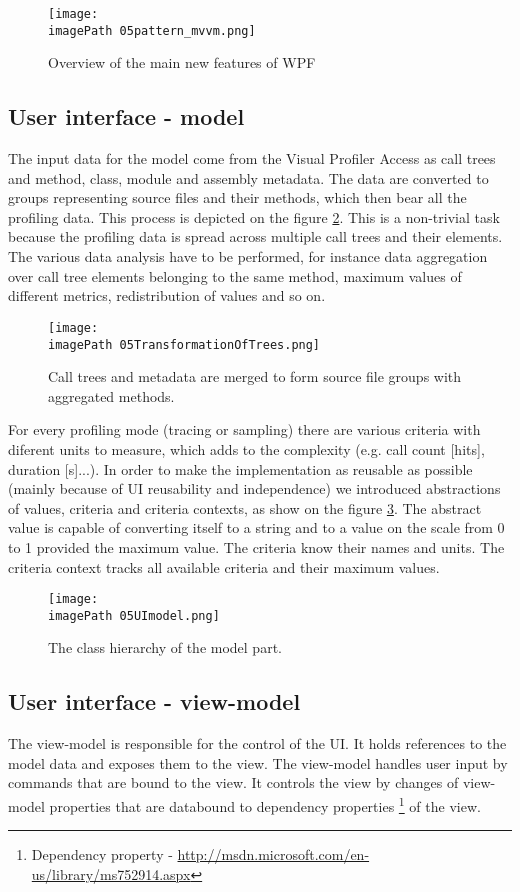\begin{figure}
	\centering
		\texttt{[image: \\imagePath 05pattern\_mvvm.png]}
		\caption{Overview of the main new features of WPF \cite{WPFpage}}
	\label{fig:05pattern_mvvm}
\end{figure}

\subsection{User interface - model}
The input data for the model come from the Visual Profiler Access as call trees and method, class, module and assembly metadata. The data are converted to groups representing source files and their methods, which then bear all the profiling data. This process is depicted on the figure \ref{fig:05TransformationOfTrees}. This is a non-trivial task because the profiling data is spread across multiple call trees and their elements. The various data analysis have to be performed, for instance data aggregation over call tree elements belonging to the same method, maximum values of different metrics, redistribution of values and so on.

 \begin{figure}
	\centering
		\texttt{[image: \\imagePath 05TransformationOfTrees.png]}
		\caption{Call trees and metadata are merged to form source file groups with aggregated methods.}
	\label{fig:05TransformationOfTrees}
\end{figure}

For every profiling mode (tracing or sampling) there are various criteria with diferent units to measure, which adds to the complexity (e.g. call count [hits], duration [s]...). In order to make the implementation as reusable as possible (mainly because of UI reusability and independence) we introduced abstractions of values, criteria and criteria contexts, as show on the figure \ref{fig:05UImodel}. The abstract value is capable of converting itself to a string and to a value on the scale from 0 to 1 provided the maximum value. The criteria know their names and units. The criteria context tracks all available criteria and their maximum values. 

 \begin{figure}
	\centering
		\texttt{[image: \\imagePath 05UImodel.png]}
		\caption{The class hierarchy of the model part.}
	\label{fig:05UImodel}
\end{figure}

\subsection{User interface - view-model}
The view-model is responsible for the control of the UI. It holds references to the model data and exposes them to the view. The view-model handles user input by commands that are bound to the view. It controls the view by changes of view-model properties that are databound to dependency properties \footnote{Dependency property - \href{http://msdn.microsoft.com/en-us/library/ms752914.aspx}{http://msdn.microsoft.com/en-us/library/ms752914.aspx}} of the view.

